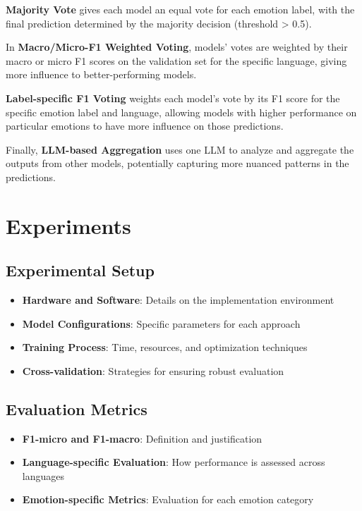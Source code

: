 \documentclass[a4paper,12pt]{extarticle}
\begin{document}
\textbf{Majority Vote} gives each model an equal vote for each emotion label, with the final prediction determined by the majority decision (threshold > 0.5). 

In \textbf{Macro/Micro-F1 Weighted Voting}, models' votes are weighted by their macro or micro F1 scores on the validation set for the specific language, giving more influence to better-performing models. 

\textbf{Label-specific F1 Voting} weights each model's vote by its F1 score for the specific emotion label and language, allowing models with higher performance on particular emotions to have more influence on those predictions. 

Finally, \textbf{LLM-based Aggregation} uses one LLM to analyze and aggregate the outputs from other models, potentially capturing more nuanced patterns in the predictions.

\section{Experiments}

\subsection{Experimental Setup}
\begin{itemize}
\item \textbf{Hardware and Software}: Details on the implementation environment
\item \textbf{Model Configurations}: Specific parameters for each approach
\item \textbf{Training Process}: Time, resources, and optimization techniques
\item \textbf{Cross-validation}: Strategies for ensuring robust evaluation
\end{itemize}

\subsection{Evaluation Metrics}
\begin{itemize}
\item \textbf{F1-micro and F1-macro}: Definition and justification
\item \textbf{Language-specific Evaluation}: How performance is assessed across languages
\item \textbf{Emotion-specific Metrics}: Evaluation for each emotion category
\end{itemize}
\end{document}
